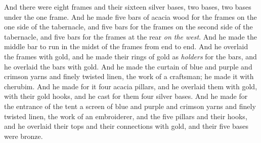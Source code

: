 \begin{biblechapter}
\verse And there were eight frames and their sixteen silver bases, two bases, two bases under the one frame.
\verse And he made five bars of acacia wood for the frames on the one side of the tabernacle,
\verse and five bars for the frames on the second side of the tabernacle, and five bars for the frames at the rear \textit{on the west}.
\verse And he made the middle bar to run in the midst of the frames from end to end.
\verse And he overlaid the frames with gold, and he made their rings of gold as \textit{holders} for the bars, and he overlaid the bars with gold.
\verse And he made the curtain of blue and purple and crimson yarns and finely twisted linen, the work of a craftsman; he made it with cherubim.
\verse And he made for it four acacia pillars, and he overlaid them with gold, with their gold hooks, and he cast for them four silver bases.
\verse And he made for the entrance of the tent a screen of blue and purple and crimson yarns and finely twisted linen, the work of an embroiderer,
\verse and the five pillars and their hooks, and he overlaid their tops and their connections with gold, and their five bases were bronze.
\end{biblechapter}

